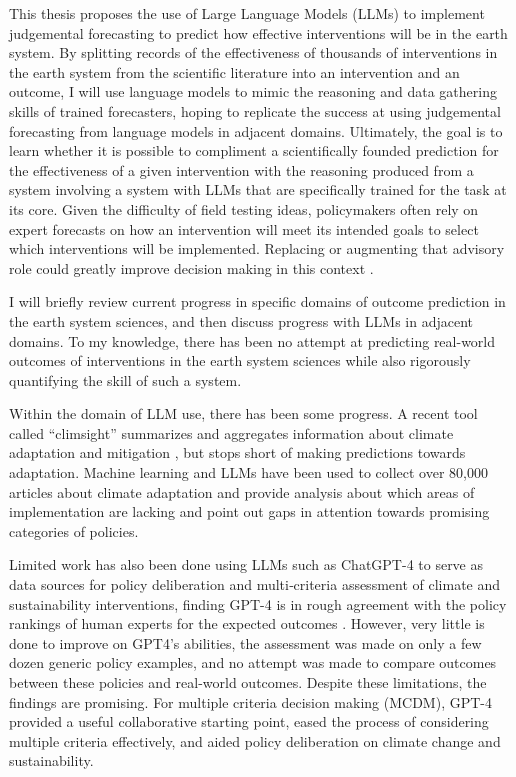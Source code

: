 \documentclass[12pt,a4paper]{article}
\begin{document}
This thesis proposes the use of Large Language Models (LLMs) to implement judgemental forecasting to predict how effective interventions will be in the earth system. By splitting records of the effectiveness of thousands of interventions in the earth system from the scientific literature into an intervention and an outcome, I will use language models to mimic the reasoning and data gathering skills of trained forecasters, hoping to replicate the success at using judgemental forecasting from language models in adjacent domains. Ultimately, the goal is to learn whether it is possible to compliment a scientifically founded prediction for the effectiveness of a given intervention with the reasoning produced from a system involving a system with LLMs that are specifically trained for the task at its core. Given the difficulty of field testing ideas, policymakers often rely on expert forecasts on how an intervention will meet its intended goals to select which interventions will be implemented. Replacing or augmenting that advisory role could greatly improve decision making in this context .

I will briefly review current progress in specific domains of outcome prediction in the earth system sciences, and then discuss progress with LLMs in adjacent domains. To my knowledge, there has been no attempt at predicting real-world outcomes of interventions in the earth system sciences while also rigorously quantifying the skill of such a system.

Within the domain of LLM use, there has been some progress. A recent tool called ``climsight'' summarizes and aggregates information about climate adaptation and mitigation , but stops short of making predictions towards adaptation. Machine learning and LLMs have been used to collect over 80,000 articles about climate adaptation and provide analysis about which areas of implementation are lacking and point out gaps in attention towards promising categories of policies.

Limited work has also been done using LLMs such as ChatGPT-4 to serve as data sources for policy deliberation and multi‑criteria assessment of climate and sustainability interventions, finding GPT-4 is in rough agreement with the policy rankings of human experts for the expected outcomes . However, very little is done to improve on GPT4's abilities, the assessment was made on only a few dozen generic policy examples, and no attempt was made to compare outcomes between these policies and real-world outcomes. Despite these limitations, the findings are promising. For multiple criteria decision making (MCDM), GPT-4 provided a useful collaborative starting point, eased the process of considering multiple criteria effectively, and aided policy deliberation on climate change and sustainability.
\end{document}
